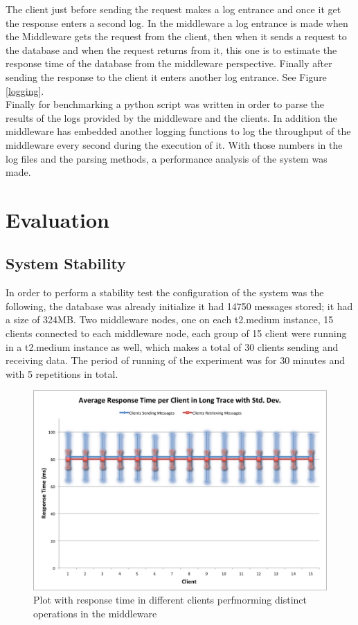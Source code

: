 The client just before sending the request makes a log entrance and once it get the response enters a second log. In the middleware a log entrance is made when the Middleware gets the request from the client, then when it sends a request to the database and when the request returns from it, this one is to estimate the response time of the database from the middleware perspective. Finally after sending the response to the client it enters another log entrance. See Figure \ref{logging}.\\

Finally for benchmarking a python script was written in order to parse the results of the logs provided by the middleware and the clients. In addition the middleware has embedded another logging functions to log the throughput of the middleware every second during the execution of it. With those numbers in the log files and the parsing methods, a performance analysis of the system was made.

\section{Evaluation}\label{sec:evaluation}


\subsection{System Stability}\label{sec:system-stability}


In order to perform a stability test the configuration of the system was the following, the database was already initialize it had 14750 messages stored; it had a size of 324MB. Two middleware nodes, one on each t2.medium instance, 15 clients connected to each middleware node, each group of 15 client were running in a t2.medium instance as well, which makes a total of 30 clients sending and receiving data. The period of running of the experiment was for 30 minutes and with 5 repetitions in total.\\
\begin{figure}[h!]
	\centering
	\includegraphics[scale=0.35]{stabilityRP.png}
	\caption{Plot with response time in different clients perfmorming distinct operations in the middleware}
	\label{stabilityRP}
\end{figure}

